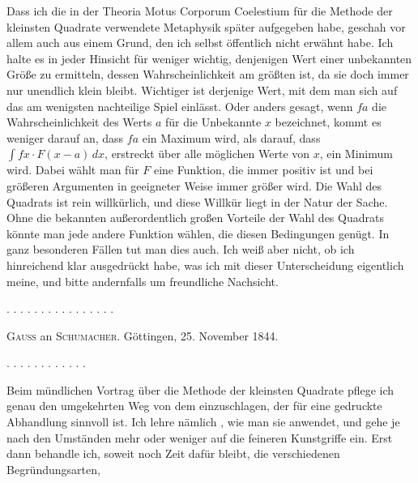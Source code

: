 Dass ich die in der Theoria Motus Corporum Coelestium für die Methode der kleinsten Quadrate verwendete Metaphysik später aufgegeben habe, geschah vor allem auch aus einem Grund, den ich selbst öffentlich nicht erwähnt habe. Ich halte es in jeder Hinsicht für weniger wichtig, denjenigen Wert einer unbekannten Größe zu ermitteln, dessen Wahrscheinlichkeit am größten ist, da sie doch immer nur unendlich klein bleibt. Wichtiger ist derjenige Wert, mit dem man sich auf das am wenigsten nachteilige Spiel einlässt. Oder anders gesagt, wenn $fa$ die Wahrscheinlichkeit des Werts $a$ für die Unbekannte $x$ bezeichnet, kommt es weniger darauf an, dass $fa$ ein Maximum wird, als darauf, dass $\int fx \cdot F(x-a)\,dx$, erstreckt über alle möglichen Werte von $x$, ein Minimum wird. Dabei wählt man für $F$ eine Funktion, die immer positiv ist und bei größeren Argumenten in geeigneter Weise immer größer wird. Die Wahl des Quadrats ist rein willkürlich, und diese Willkür liegt in der Natur der Sache. Ohne die bekannten außerordentlich großen Vorteile der Wahl des Quadrats könnte man jede andere Funktion wählen, die diesen Bedingungen genügt. In ganz besonderen Fällen tut man dies auch. Ich weiß aber nicht, ob ich hinreichend klar ausgedrückt habe, was ich mit dieser Unterscheidung eigentlich meine, und bitte andernfalls um freundliche Nachsicht.

. . . . . . . . . . . . . . . .

\begin{center}\textsc{Gauss} an \textsc{Schumacher}. Göttingen, 25. November 1844.\end{center}

. . . . . . . . . . . .

Beim mündlichen Vortrag über die Methode der kleinsten Quadrate pflege ich genau den umgekehrten Weg von dem einzuschlagen, der für eine gedruckte Abhandlung sinnvoll ist. Ich lehre nämlich , wie man sie anwendet, und gehe je nach den Umständen mehr oder weniger auf die feineren Kunstgriffe ein. Erst dann behandle ich, soweit noch Zeit dafür bleibt, die verschiedenen Begründungsarten,
